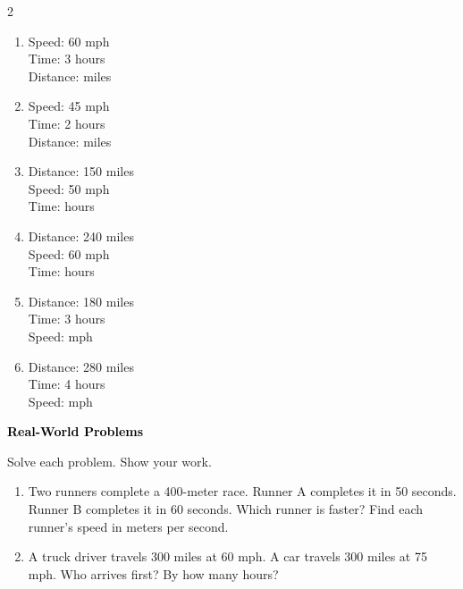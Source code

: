 \documentclass[12pt, letterpaper, fleqn]{article}
\newcommand{\blank}{\underline{\hspace{2.2cm}}}
\begin{document}
\vspace{3mm}

\begin{multicols}{2}
\begin{enumerate}[itemsep=1.3cm, leftmargin=0.6cm]
\item Speed: 60 mph\\
Time: 3 hours\\
Distance: \blank \; miles

\item Speed: 45 mph\\
Time: 2 hours\\
Distance: \blank \; miles

\item Distance: 150 miles\\
Speed: 50 mph\\
Time: \blank \; hours

\item Distance: 240 miles\\
Speed: 60 mph\\
Time: \blank \; hours

\item Distance: 180 miles\\
Time: 3 hours\\
Speed: \blank \; mph

\item Distance: 280 miles\\
Time: 4 hours\\
Speed: \blank \; mph

\end{enumerate}
\end{multicols}

\newpage

\begin{tcolorbox}[colback=customteal!20]
\large\textcolor{black}{\textbf{Real-World Problems}}
\end{tcolorbox}

\noindent
Solve each problem. Show your work.

\vspace{3mm}

\begin{enumerate}[itemsep=2cm, leftmargin=0.6cm]

\item Two runners complete a 400-meter race. Runner A completes it in 50 seconds. Runner B completes it in 60 seconds. Which runner is faster? Find each runner's speed in meters per second.\\
\vspace{2.5cm}

\item A truck driver travels 300 miles at 60 mph. A car travels 300 miles at 75 mph. Who arrives first? By how many hours?\\
\vspace{2.5cm}

\end{enumerate}
\end{document}
